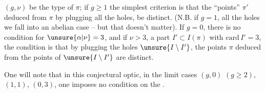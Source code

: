  $(g,\nu)$ be the type of $\pi$;  if $g\geq1$ the simplest criterion is that the ``\inserted{$\Gamma^{\natural}$-}points''  $\pi'$ deduced from $\pi$ by plugging all the holes, be distinct.  (N.B. if $g=1$,    all the holes we fall into an abelian case -- but that doesn't matter). If $g=0$,  there is no condition for $\unsure{\alpha|\nu}=3$, and if $\nu>3$,  a  part $I'\subset I(\pi)$ with $\mathrm{card}\,I'=3$, the condition is that by plugging the holes  $\unsure{I\setminus I'}$, the \inserted{$\Gamma^{\natural}$-}points  $\pi$ deduced from the points of $\unsure{I\setminus I'}$ are distinct.

One will note that in this conjectural optic, in the limit cases $(g,0)$ $(g\geq2)$, $(1,1)$, $(0,3)$, one imposes no condition  on the .

